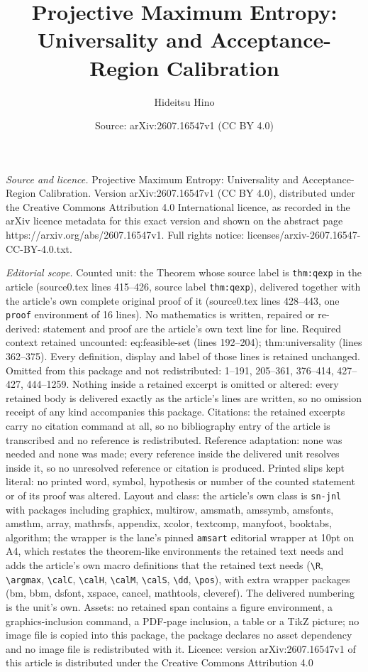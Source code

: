 \documentclass[10pt,a4paper]{amsart}
\title[Projective Maximum Entropy: Universality and Acceptance-Regi]{Projective Maximum Entropy: Universality and Acceptance-Region Calibration}
\author{Hideitsu Hino}
\date{Source: arXiv:2607.16547v1 (CC BY 4.0)}
\begin{document}
\maketitle

\noindent\emph{Source and licence.} Projective Maximum Entropy: Universality and Acceptance-Region Calibration. Version arXiv:2607.16547v1 (CC BY 4.0), distributed under the Creative Commons Attribution 4.0 International licence, as recorded in the arXiv licence metadata for this exact version and shown on the abstract page https://arxiv.org/abs/2607.16547v1. Full rights notice: licenses/arxiv-2607.16547-CC-BY-4.0.txt.\par\smallskip

\noindent\textit{Editorial scope.} Counted unit: the Theorem whose source label is \texttt{thm:qexp} in the article (source0.tex lines 415--426, source label \texttt{thm:qexp}), delivered together with the article's own complete original proof of it (source0.tex lines 428--443, one \texttt{proof} environment of 16 lines). No mathematics is written, repaired or re-derived: statement and proof are the article's own text line for line. Required context retained uncounted: eq:feasible-set (lines 192--204); thm:universality (lines 362--375). Every definition, display and label of those lines is retained unchanged. Omitted from this package and not redistributed: 1--191, 205--361, 376--414, 427--427, 444--1259. Nothing inside a retained excerpt is omitted or altered: every retained body is delivered exactly as the article's lines are written, so no omission receipt of any kind accompanies this package. Citations: the retained excerpts carry no citation command at all, so no bibliography entry of the article is transcribed and no reference is redistributed. Reference adaptation: none was needed and none was made; every reference inside the delivered unit resolves inside it, so no unresolved reference or citation is produced. Printed slips kept literal: no printed word, symbol, hypothesis or number of the counted statement or of its proof was altered. Layout and class: the article's own class is \texttt{sn-jnl} with packages including graphicx, multirow, amsmath, amssymb, amsfonts, amsthm, array, mathrsfs, appendix, xcolor, textcomp, manyfoot, booktabs, algorithm; the wrapper is the lane's pinned \texttt{amsart} editorial wrapper at 10pt on A4, which restates the theorem-like environments the retained text needs and adds the article's own macro definitions that the retained text needs (\texttt{\textbackslash R}, \texttt{\textbackslash argmax}, \texttt{\textbackslash calC}, \texttt{\textbackslash calH}, \texttt{\textbackslash calM}, \texttt{\textbackslash calS}, \texttt{\textbackslash dd}, \texttt{\textbackslash pos}), with extra wrapper packages (bm, bbm, dsfont, xspace, cancel, mathtools, cleveref). The delivered numbering is the unit's own. Assets: no retained span contains a figure environment, a graphics-inclusion command, a PDF-page inclusion, a table or a TikZ picture; no image file is copied into this package, the package declares no asset dependency and no image file is redistributed with it. Licence: version arXiv:2607.16547v1 of this article is distributed under the Creative Commons Attribution 4.0 
\end{document}
